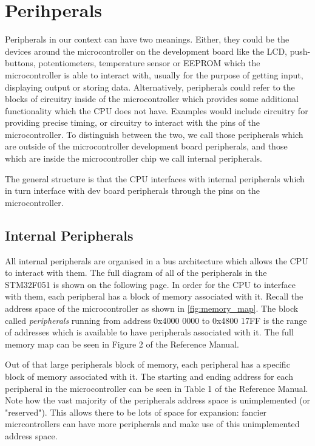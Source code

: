 \chapter{Perihperals}
Peripherals in our context can have two meanings. Either, they could be the devices around the microcontroller on the development board like the LCD, push-buttons, potentiometers, temperature sensor or EEPROM which the microcontroller is able to interact with, usually for the purpose of getting input, displaying output or storing data. Alternatively, peripherals could refer to the blocks of circuitry inside of the microcontroller which provides some additional functionality which the CPU does not have. Examples would include circuitry for providing precise timing, or circuitry to interact with the pins of the microcontroller. To distinguish between the two, we call those peripherals which are outside of the microcontroller development board peripherals, and those which are inside the microcontroller chip we call internal peripherals. 

The general structure is that the CPU interfaces with internal peripherals which in turn interface with dev board peripherals through the pins on the microcontroller.

\section{Internal Peripherals}
All internal peripherals are organised in a bus architecture which allows the CPU to interact with them. The full diagram of all of the peripherals in the STM32F051 is shown on the following page.
\afterpage{
  \centering
  
}
In order for the CPU to interface with them, each peripheral has a block of memory associated with it. Recall the address space of the microcontroller as shown in \autoref{fig:memory_map}. The block called \emph{peripherals} running from address 0x4000 0000 to 0x4800 17FF is the range of addresses which is available to have peripherals associated with it. The full memory map can be seen in Figure 2 of the Reference Manual. 

Out of that large peripherals block of memory, each peripheral has a specific block of memory associated with it. The starting and ending address for each peripheral in the microcontroller can be seen in Table 1 of the Reference Manual. Note how the vast majority of the peripherals address space is unimplemented (or "reserved"). This allows there to be lots of space for expansion: fancier micrcontrollers can have more peripherals and make use of this unimplemented address space. 


